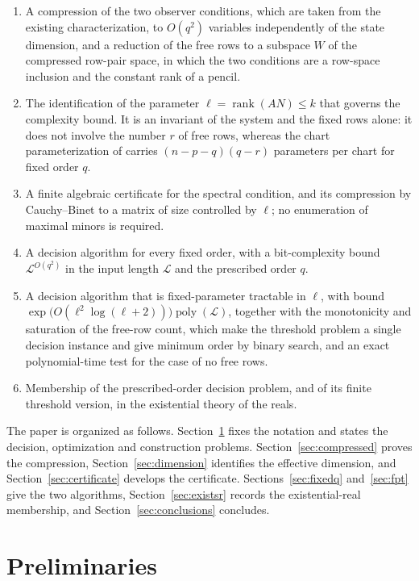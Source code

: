\documentclass[journal]{IEEEtran}
\theoremstyle{plainn}
\theoremstyle{remark}
\begin{document}
\begin{enumerate}
\item A compression of the two observer conditions, which are taken from the existing
characterization, to $O(q^2)$ variables independently of the state dimension, and a
reduction of the free rows to a subspace $W$ of the compressed row-pair space, in which the
two conditions are a row-space inclusion and the constant rank of a pencil.
\item The identification of the parameter $\ell=\operatorname{rank}(AN)\le k$ that governs
the complexity bound. It is an invariant of the system and the fixed rows alone: it does not
involve the number $r$ of free rows, whereas the chart parameterization of \cite{fer26b}
carries $(n-p-q)(q-r)$ parameters per chart for fixed order $q$.
\item A finite algebraic certificate for the spectral condition, and its compression by
Cauchy--Binet to a matrix of size controlled by $\ell$; no enumeration of maximal minors is
required.
\item A decision algorithm for every fixed order, with a bit-complexity bound
$\mathcal L^{O(q^2)}$ in the input length $\mathcal L$ and the prescribed order $q$.
\item A decision algorithm that is fixed-parameter tractable in $\ell$, with bound
$\exp\bigl(O(\ell^2\log(\ell+2))\bigr)\operatorname{poly}(\mathcal L)$, together with the
monotonicity and saturation of the free-row count, which make the threshold problem a single
decision instance and give minimum order by binary search, and an exact polynomial-time test
for the case of no free rows.
\item Membership of the prescribed-order decision problem, and of its finite threshold
version, in the existential theory of the reals.
\end{enumerate}

The paper is organized as follows. Section~\ref{sec:prelim} fixes the notation and states
the decision, optimization and construction problems. Section~\ref{sec:compressed} proves
the compression, Section~\ref{sec:dimension} identifies the effective dimension, and
Section~\ref{sec:certificate} develops the certificate. Sections~\ref{sec:fixedq}
and~\ref{sec:fpt} give the two algorithms, Section~\ref{sec:existsr} records the
existential-real membership, and Section~\ref{sec:conclusions} concludes.

\section{Preliminaries}\label{sec:prelim}
\end{document}
